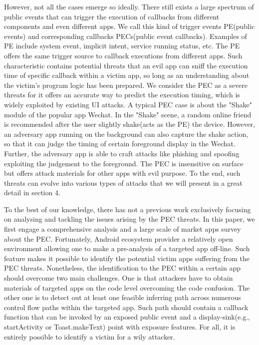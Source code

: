 However, not all the cases emerge so ideally. There still exists a large spectrum of public events that can trigger the execution of callbacks from different components and even different apps. We call this kind of trigger events PE(public events) and corresponding callbacks PECs(public event callbacks). Examples of PE include system event, implicit intent, service running status, etc. The PE offers the same trigger source to callback executions from different apps. Such characteristic contains potential threats that an evil app can sniff the execution time of specific callback within a victim app, so long as an understanding about the victim's program logic has been prepared. We consider the PEC as a severe threats for it offers an accurate way to predict the execution timing, which is widely exploited by existing UI attacks\cite{chen2014peeking}\cite{bianchi2015app}\cite{ren2015towards}. A typical PEC case is about the "Shake" module of the popular app Wechat. In the "Shake" scene, a random online friend is recommended after the user slightly shake(acts as the PE) the device. However, an adversary app running on the background can also capture the shake action, so that it can judge the timing of certain foreground display in the Wechat. Further, the adversary app is able to craft attacks like phishing and spoofing exploiting the judgement to the foreground. The PEC is insensitive on surface but offers attack materials for other apps with evil purpose. To the end, such threats can evolve into various types of attacks that we will present in a great detail in section 4.


To the best of our knowledge, there has not a previous work exclusively focusing on analysing and tackling the issues arising by the PEC threats. In this paper, we first engage a comprehensive analysis and a large scale of market apps survey about the PEC. Fortunately, Android ecosystem provider a relatively open environment allowing one to make a pre-analysis of a targeted app off-line. Such feature makes it possible to identify the potential victim apps suffering from the PEC threats. Nonetheless, the identification to the PEC within a certain app should overcome two main challenges. One is that attackers have to obtain materials of targeted apps on the code level overcoming the code confusion. The other one is to detect out at least one feasible inferring path across numerous control flow paths within the targeted app. Such path should contain a callback function that can be invoked by an exposed public event and a display-sink(e.g., startActivity or Toast.makeText) point with exposure features. For all, it is entirely possible to identify a victim for a wily attacker. 

